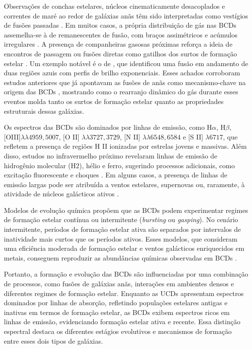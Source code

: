 Observações de conchas estelares, núcleos cinematicamente desacoplados e correntes de maré ao redor de galáxias anãs têm sido interpretadas como vestígios de fusões passadas \citep{Geha_2005, Rich_2012, Penny_2012, Toloba_2014, Daya_2022}. Em muitos casos, a própria distribuição de gás nas BCDs assemelha-se à de remanescentes de fusão, com braços assimétricos e acúmulos irregulares \citep{Ekta_2008}. A presença de companheiras gasosas próximas reforça a ideia de encontros de passagem ou fusões diretas como gatilhos dos surtos de formação estelar \citep{Pustilnik_2001}. Um exemplo notável é o de \cite{Pak_2016}, que identificou uma fusão em andamento de duas regiões azuis com perfis de brilho exponenciais. Esses achados corroboram estudos anteriores que já apontavam as fusões de anãs como mecanismo-chave na origem das BCDs \citep{Noeske_2001, Ostlin_2001, Bekki_2008}, mostrando como o rearranjo dinâmico do gás durante esses eventos molda tanto os surtos de formação estelar quanto as propriedades estruturais dessas galáxias.

Os espectros das BCDs são dominados por linhas de emissão, como H$\alpha$, H$\beta$, [OIII]$\lambda \lambda 4959,5007$, [O II] $\lambda \lambda 3727,3729$, [N II] $\lambda \lambda 6548, 6584$ e [S II] $\lambda 6717$, que refletem a presença de regiões H II ionizadas por estrelas jovens e massivas. Além disso, estudos no infravermelho próximo revelaram linhas de emissão de hidrogênio molecular (H$2$), hélio e ferro, sugerindo processos adicionais, como excitação fluorescente e choques \citep{Izotov_2011}. Em alguns casos, a presença de linhas de emissão largas pode ser atribuída a ventos estelares, supernovas ou, raramente, à atividade de núcleos galácticos ativos \citep{Izotov_2007}.

Modelos de evolução química propõem que as BCDs podem experimentar regimes de formação estelar contínua ou intermitente (\textit{bursting} ou \textit{gasping}). No cenário intermitente, períodos de formação estelar ativa são separados por intervalos de inatividade mais curtos que os períodos ativos. Esses modelos, que consideram uma eficiência moderada de formação estelar e ventos galácticos enriquecidos em metais, conseguem reproduzir as abundâncias químicas observadas em BCDs \citep{Yin_2011}.

Portanto, a formação e evolução das BCDs são influenciadas por uma combinação de processos, como fusões de galáxias anãs, interações em ambientes densos e diferentes regimes de formação estelar. Enquanto as UCDs apresentam espectros dominados por linhas de absorção, refletindo populações estelares antigas e inativas em termos de formação estelar, as BCDs exibem espectros ricos em linhas de emissão, evidenciando formação estelar ativa e recente. Essa distinção espectral destaca os diferentes estágios evolutivos e mecanismos de formação entre esses dois tipos de galáxias.

